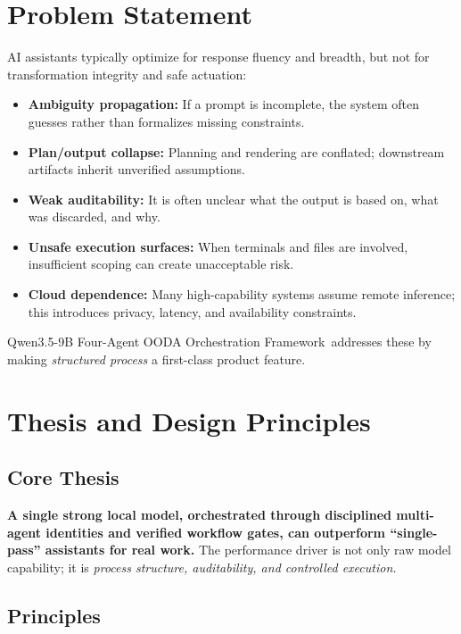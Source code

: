 \documentclass[11pt]{article}
\newcommand{\FrameworkName}{Qwen3.5-9B Four-Agent OODA Orchestration Framework}
\begin{document}
\section{Problem Statement}

AI assistants typically optimize for response fluency and breadth, but not for transformation integrity and safe actuation:
\begin{itemize}
  \item \textbf{Ambiguity propagation:} If a prompt is incomplete, the system often guesses rather than formalizes missing constraints.
  \item \textbf{Plan/output collapse:} Planning and rendering are conflated; downstream artifacts inherit unverified assumptions.
  \item \textbf{Weak auditability:} It is often unclear what the output is based on, what was discarded, and why.
  \item \textbf{Unsafe execution surfaces:} When terminals and files are involved, insufficient scoping can create unacceptable risk.
  \item \textbf{Cloud dependence:} Many high-capability systems assume remote inference; this introduces privacy, latency, and availability constraints.
\end{itemize}

\FrameworkName\ addresses these by making \emph{structured process} a first-class product feature.

\section{Thesis and Design Principles}

\subsection{Core Thesis}

\textbf{A single strong local model, orchestrated through disciplined multi-agent identities and verified workflow gates, can outperform ``single-pass'' assistants for real work.}
The performance driver is not only raw model capability; it is \emph{process structure, auditability, and controlled execution.}

\subsection{Principles}
\end{document}
